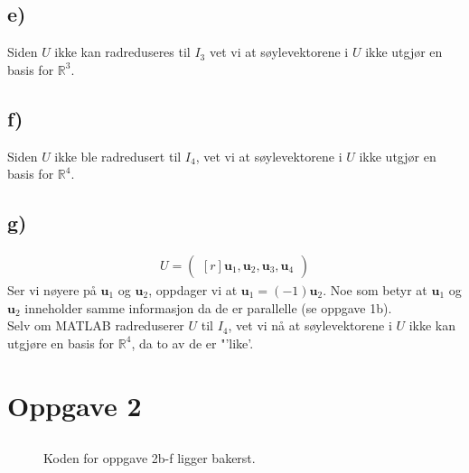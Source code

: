 \documentclass[11pt]{article}
\renewcommand{\vec}[1]{\mathbf{#1}}
\newcommand{\bpm}{\begin{pmatrix*}[r]}
\newcommand{\epm}{\end{pmatrix*}}
\begin{document}
	\subsection*{e)}
		\begin{figure}[H]
			
			
		\end{figure}
		Siden $U$ ikke kan radreduseres til $I_{3}$ vet vi at søylevektorene i $U$ ikke utgjør en basis for $\mathbb{R}^3$.
	\subsection*{f)}
		\begin{figure}[H]
			
			
		\end{figure}
		Siden $U$ ikke ble radredusert til $I_{4}$, vet vi at søylevektorene i $U$ ikke utgjør en basis for $\mathbb{R}^4$.
	\subsection*{g)}
		\begin{figure}[H]
			
			
		\end{figure}
		\begin{align*}
			U = \bpm \vec{u}_{1} , \vec{u}_{2} , \vec{u}_{3} , \vec{u}_{4} \epm
		\end{align*}
		Ser vi nøyere på $\vec{u}_{1}$ og $\vec{u}_{2}$, oppdager vi at $\vec{u}_{1} = (-1)\vec{u}_{2}$. Noe som betyr at $\vec{u}_{1}$ og $\vec{u}_{2}$ inneholder samme informasjon da de er parallelle (se oppgave 1b).\\\indent Selv om MATLAB radreduserer $U$ til $I_{4}$, vet vi nå at søylevektorene i $U$ ikke kan utgjøre en basis for $\mathbb{R}^4$, da to av de er "'like'.
	\section*{Oppgave 2}
	\subsection*{}
		\begin{figure}[H]
			
			\noindent Koden for oppgave 2b-f ligger bakerst.
		\end{figure}
\end{document}
